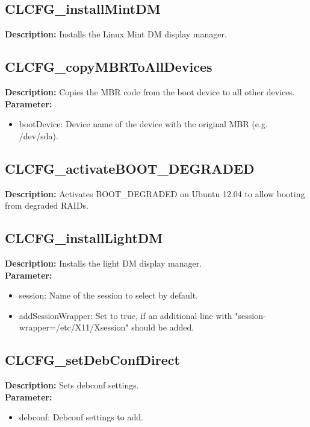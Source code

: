 \subsection{CLCFG\_installMintDM}
\textbf{Description:} Installs the Linux Mint DM display manager.\\

\subsection{CLCFG\_copyMBRToAllDevices}
\textbf{Description:} Copies the MBR code from the boot device to all other devices.\\
\textbf{Parameter:}
\begin{itemize}
\item bootDevice: Device name of the device with the original MBR (e.g. /dev/sda).
\end{itemize}

\subsection{CLCFG\_activateBOOT\_DEGRADED}
\textbf{Description:} Activates BOOT\_DEGRADED on Ubuntu 12.04 to allow booting from degraded RAIDs.\\

\subsection{CLCFG\_installLightDM}
\textbf{Description:} Installs the light DM display manager.\\
\textbf{Parameter:}
\begin{itemize}
\item session: Name of the session to select by default.
\item addSessionWrapper: Set to true, if an additional line with "session-wrapper=/etc/X11/Xsession" should be added.
\end{itemize}

\subsection{CLCFG\_setDebConfDirect}
\textbf{Description:} Sets debconf settings.\\
\textbf{Parameter:}
\begin{itemize}
\item debconf: Debconf settings to add.
\end{itemize}

